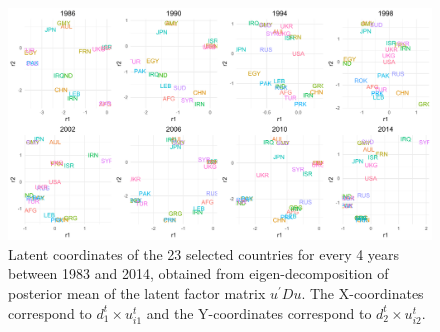 \documentclass[a4paper]{article}
\begin{document}
  \begin{figure}[ht]
  	\begin{center}  
  		 \includegraphics[width=1\textwidth]{plots/UDU_4thyears_reduced.pdf}
  		  		  		    		  	\end{center}
  	\caption {Latent coordinates of the 23 selected countries for every 4 years between 1983 and 2014, obtained from eigen-decomposition of posterior mean of the latent factor matrix $u^\prime Du$. The X-coordinates correspond to $d^t_1\times u^t_{i1}$ and the Y-coordinates correspond to $d^t_2\times u^t_{i2}$.}
  	\label{figure:UDplot}
  \end{figure}
\newpage
\end{document}
